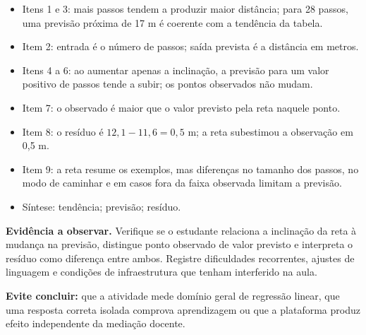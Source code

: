 \documentclass[12pt,a4paper]{article}
\begin{document}
\begin{itemize}
  \item Itens 1 e 3: mais passos tendem a produzir maior distância; para 28 passos, uma previsão próxima de 17 m é coerente com a tendência da tabela.
  \item Item 2: entrada é o número de passos; saída prevista é a distância em metros.
  \item Itens 4 a 6: ao aumentar apenas a inclinação, a previsão para um valor positivo de passos tende a subir; os pontos observados não mudam.
  \item Item 7: o observado é maior que o valor previsto pela reta naquele ponto.
  \item Item 8: o resíduo é $12{,}1-11{,}6=0{,}5$ m; a reta subestimou a observação em 0,5 m.
  \item Item 9: a reta resume os exemplos, mas diferenças no tamanho dos passos, no modo de caminhar e em casos fora da faixa observada limitam a previsão.
  \item Síntese: tendência; previsão; resíduo.
\end{itemize}

\textbf{Evidência a observar.} Verifique se o estudante relaciona a inclinação da reta à mudança na previsão, distingue ponto observado de valor previsto e interpreta o resíduo como diferença entre ambos. Registre dificuldades recorrentes, ajustes de linguagem e condições de infraestrutura que tenham interferido na aula.

\textbf{Evite concluir:} que a atividade mede domínio geral de regressão linear, que uma resposta correta isolada comprova aprendizagem ou que a plataforma produz efeito independente da mediação docente.
\end{document}
